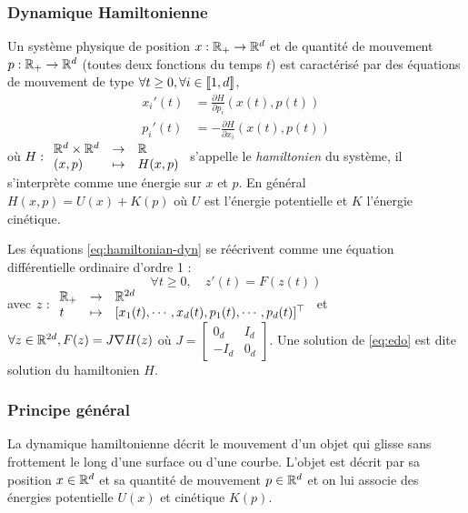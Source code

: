 \documentclass[10pt,a4paper]{article}
\begin{document}
\subsubsection{Dynamique Hamiltonienne}

Un système physique de position $x : \mathbb{R}_+ \to \mathbb{R}^d$ et de quantité de mouvement $p : \mathbb{R}_+ \to \mathbb{R}^d$ (toutes deux fonctions du temps $t$) est caractérisé par des équations de mouvement de type $\forall t \geq 0, \forall i \in {\left\llbracket 1,d \right\rrbracket}$, 
\begin{equation}\label{eq:hamiltonian-dyn}
	\begin{aligned}
		x_i'(t) &= \frac{\partial H}{\partial p_i} (x(t), p(t)) \\
		p_i' (t) &= -\frac{\partial H}{\partial x_i} (x(t), p(t))
	\end{aligned}
\end{equation}
où $H : { \begin{array}{lcl} \mathbb{R}^d \times \mathbb{R}^d & \to & \mathbb{R} \\ (x,p) & \mapsto & H(x,p) \end{array} }$ s'appelle le {\it hamiltonien} du système, il s'interprète comme une énergie sur $x$ et $p$. En général $H(x,p) = U(x) + K(p)$ où $U$ est l'énergie potentielle et $K$ l'énergie cinétique.

\begin{Rque}\label{rque:edo}
	Les équations \eqref{eq:hamiltonian-dyn} se réécrivent comme une équation différentielle ordinaire d'ordre 1 :
	\begin{equation}\label{eq:edo}
		\forall t \geq 0, \quad z'(t) = F(z(t))
		\tag{EDO}
	\end{equation}
	avec $z : { \begin{array}{lcl}  \mathbb{R}_+ & \to & \mathbb{R}^{2d} \\ t & \mapsto & [x_1(t), \cdots, x_d(t), p_1(t), \cdots, p_d(t)]^\top \end{array} }$ et $\forall z \in \mathbb{R}^{2d}, F(z) = J \nabla H (z)$ où
	$J = \begin{bmatrix}
		0_{d} & I_{d} \\
		-I_{d} & 0_{d}
	\end{bmatrix}$.
	Une solution de \eqref{eq:edo} est dite solution du hamiltonien $H$.
\end{Rque}

\subsubsection{Principe général}

La dynamique hamiltonienne décrit le mouvement d'un objet qui glisse sans frottement le long d'une surface ou d'une courbe. L'objet est décrit par sa position $x \in \mathbb{R}^d$ et sa quantité de mouvement $p \in \mathbb{R}^d$ et on lui associe des énergies potentielle $U(x)$ et cinétique $K(p)$.
\end{document}
